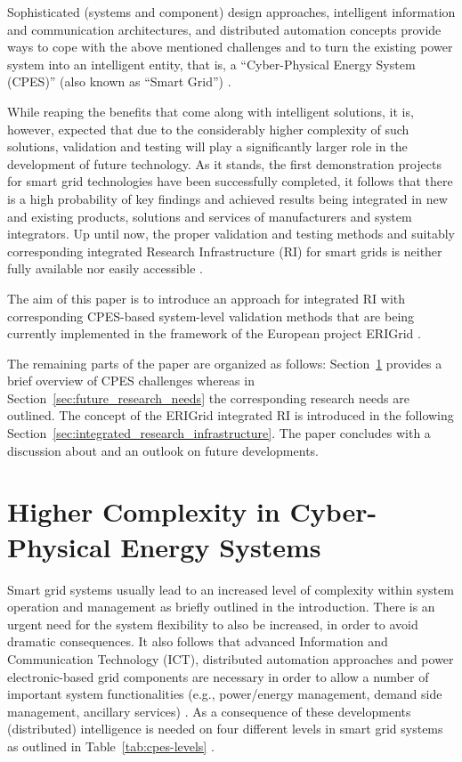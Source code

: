 \documentclass[runningheads,a4paper]{llncs}
\begin{document}
Sophisticated (systems and component) design approaches, intelligent information and communication architectures, and distributed automation concepts provide ways to cope with the above mentioned challenges and to turn the existing power system into an intelligent entity, that is, a ``Cyber-Physical Energy System (CPES)'' (also known as ``Smart Grid'') \cite{IEA:2011,Farhangi:2010,Strasser:2013}. 

While reaping the benefits that come along with intelligent solutions, it is, however, expected that due to the considerably higher complexity of such solutions, validation and testing will play a significantly larger role in the development of future technology. As it stands, the first demonstration projects for smart grid technologies have been successfully completed, it follows that there is a high probability of key findings and achieved results being integrated in new and existing products, solutions and services of manufacturers and system integrators. Up until now, the proper validation and testing methods and suitably corresponding integrated Research Infrastructure (RI) for smart grids is neither fully available nor easily accessible \cite{Strasser:2017}.  

The aim of this paper is to introduce an approach for integrated RI with corresponding CPES-based system-level validation methods that are being currently implemented in the framework of the European project ERIGrid \cite{ERIGrid:URL}. 

The remaining parts of the paper are organized as follows: Section~\ref{sec:cyber-physical_energy_systems} provides a brief overview of CPES challenges whereas in Section~\ref{sec:future_research_needs} the corresponding research needs are outlined. The concept of the ERIGrid integrated RI is introduced in the following Section~\ref{sec:integrated_research_infrastructure}. The paper concludes with a discussion about and an outlook on future developments.
%
%
\section{Higher Complexity in Cyber-Physical Energy Systems}
\label{sec:cyber-physical_energy_systems}

Smart grid systems usually lead to an increased level of complexity within system operation and management as briefly outlined in the introduction. There is an urgent need for the system flexibility to also be increased, in order to avoid dramatic consequences. It also follows that advanced Information and Communication Technology (ICT), distributed automation approaches and power electronic-based grid components are necessary in order to allow a number of important system functionalities (e.g., power/energy management, demand side management, ancillary services) \cite{IEA:2011,Farhangi:2010}. As a consequence of these developments (distributed) intelligence is needed on four different levels in smart grid systems as outlined in Table~\ref{tab:cpes-levels} \cite{Strasser:2015,Strasser:2017}.
\end{document}
